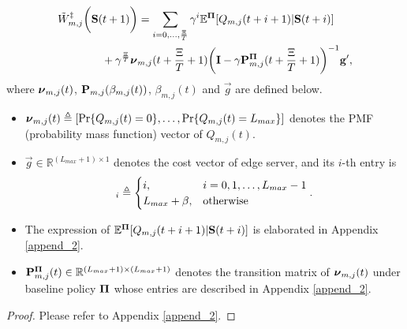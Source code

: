 \begin{lemma}
    \label{lemma:w_es}
    {\small
    \begin{align}
        &\tilde{W}^{\ddagger}_{m,j}\bigg(\mathbf{S}(t+1)\bigg)
    = \sum_{i=0,\dots,\frac{\Xi}{T}} \gamma^{i} \mathbb{E}^{\boldsymbol{\Pi}}[ Q_{m,j}({t+i+1}) | \mathbf{S}(t+i)]
    \nonumber\\
    &~~~~~~~~~~~~+ \gamma^{\frac{\Xi}{T}} 
    \boldsymbol{\nu}_{m,j}({t+\frac{\Xi}{T}+1})
    \bigg(
        \mathbf{I} - \gamma \mathbf{P}^{\boldsymbol{\Pi}}_{m,j}(t+\frac{\Xi}{T}+1)
    \bigg)^{-1} \mathbf{g}',
        \label{w_es}
    \end{align}   
    }
    where $\boldsymbol{\nu}_{m,j}(t)$, $\mathbf{P}_{m,j}(\beta_{m,j}(t))$, $\beta_{m,j}(t)$ and $\vec{g}$ are defined below.
    \begin{itemize}
        \item {\small
        $\boldsymbol{\nu}_{m,j}(t) \triangleq [\Pr\{Q_{m,j}(t)=0\}, \dots, \Pr\{Q_{m,j}(t)=L_{max}\}]$
        } denotes the PMF (probability mass function) vector of $Q_{m,j}(t)$.
        \item $\vec{g} \in \mathbb{R}^{(L_{max}+1) \times 1}$ denotes the cost vector of edge server, and its $i$-th entry is
        \begin{align}
            [\vec{g}]_{i} \define 
            \begin{cases}
                i, & i=0,1,\dots,L_{max}-1
                \\
                L_{max}+\beta, & \text{otherwise}
            \end{cases}.
            \label{eqn:g_vec}
        \end{align}
        \item The expression of $\mathbb{E}^{\boldsymbol{\Pi}}[ Q_{m,j}({t+i+1}) | \mathbf{S}(t+i)]$ is elaborated in Appendix \ref{append_2}.
        \item $\mathbf{P}^{\boldsymbol{\Pi}}_{m,j}(t) \in \mathbb{R}^{(L_{max}+1) \times (L_{max}+1)}$ denotes the transition matrix of $\boldsymbol{\nu}_{m,j}(t)$ under baseline policy $\boldsymbol{\Pi}$ whose entries are described in Appendix \ref{append_2}.
    \end{itemize}   
\end{lemma}
\begin{proof}
    Please refer to Appendix \ref{append_2}.
\end{proof}

